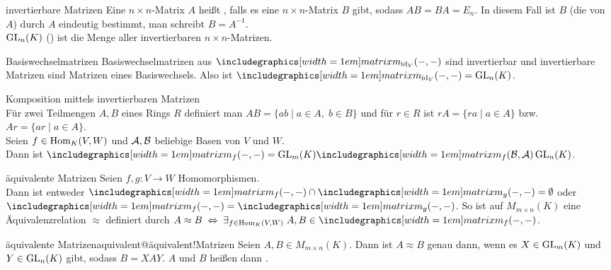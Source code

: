 \begin{Def}{invertierbare Matrizen}
    Eine $n \times n$-Matrix $A$ heißt , falls es
    eine $n \times n$-Matrix $B$ gibt, sodass $AB = BA = E_n$.
    In diesem Fall ist $B$ (die  von $A$) durch $A$
    eindeutig bestimmt, man schreibt $B = A^{-1}$. \\
    $\operatorname{GL}_n(K)$ () ist die Menge aller
    invertierbaren $n \times n$-Matrizen.
\end{Def}

\begin{Lemma}{Basiswechselmatrizen}
    Basiswechselmatrizen aus $\hommatrix{\id_V}{-}{-}$ sind invertierbar
    und invertierbare Matrizen sind Matrizen eines
    Basiswechsels.
    Also ist $\hommatrix{\id_V}{-}{-} = \GL_n(K)$.
\end{Lemma}

\begin{Satz}{Komposition mittels invertierbaren Matrizen} \\
    Für zwei Teilmengen $A, B$ eines Rings $R$ definiert man
    $AB = \{ab \;|\; a \in A,\; b \in B\}$ und für $r \in R$ ist
    $rA = \{ra \;|\; a \in A\}$ bzw. $Ar = \{ar \;|\; a \in A\}$. \\
    Seien $f \in \operatorname{Hom}_K(V, W)$ und $\mathcal{A}, \mathcal{B}$ beliebige Basen
    von $V$ und $W$. \\
    Dann ist $\hommatrix{f}{-}{-} = \GL_m(K) \hommatrix{f}{B}{A} \GL_n(K)$.
\end{Satz}

\begin{Satz}{äquivalente Matrizen}
    Seien $f, g: V \rightarrow W$ Homomorphismen. \\
    Dann ist entweder
    $\hommatrix{f}{-}{-} \cap \hommatrix{g}{-}{-} = \emptyset$ oder
    $\hommatrix{f}{-}{-} = \hommatrix{g}{-}{-}$.
    So ist auf $M_{m \times n}(K)$ eine Äquivalenzrelation $\approx$ definiert
    durch $A \approx B \;\Leftrightarrow\;
    \exists_{f \in \Hom_K(V, W)}\; A, B \in \hommatrix{f}{-}{-}$.
\end{Satz}

\begin{xDef}{äquivalente Matrizen}{aquivalent@äquivalent!Matrizen}
    Seien $A, B \in M_{m \times n}(K)$.
    Dann ist $A \approx B$ genau dann, wenn es $X \in \operatorname{GL}_m(K)$ und
    $Y \in \operatorname{GL}_n(K)$ gibt, sodass $B = XAY$.
    $A$ und $B$ heißen dann
    .
\end{xDef}

